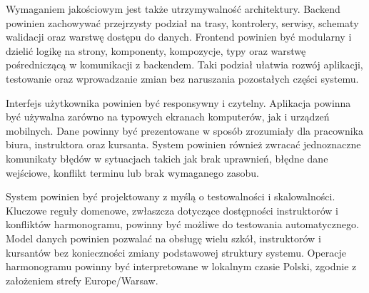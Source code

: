 Wymaganiem jakościowym jest także utrzymywalność architektury. Backend powinien zachowywać przejrzysty podział na trasy, kontrolery, serwisy, schematy walidacji oraz warstwę dostępu do danych. Frontend powinien być modularny i dzielić logikę na strony, komponenty, kompozycje, typy oraz warstwę pośredniczącą w komunikacji z backendem. Taki podział ułatwia rozwój aplikacji, testowanie oraz wprowadzanie zmian bez naruszania pozostałych części systemu.

Interfejs użytkownika powinien być responsywny i czytelny. Aplikacja powinna być używalna zarówno na typowych ekranach komputerów, jak i urządzeń mobilnych. Dane powinny być prezentowane w sposób zrozumiały dla pracownika biura, instruktora oraz kursanta. System powinien również zwracać jednoznaczne komunikaty błędów w sytuacjach takich jak brak uprawnień, błędne dane wejściowe, konflikt terminu lub brak wymaganego zasobu.

System powinien być projektowany z myślą o testowalności i skalowalności. Kluczowe reguły domenowe, zwłaszcza dotyczące dostępności instruktorów i konfliktów harmonogramu, powinny być możliwe do testowania automatycznego. Model danych powinien pozwalać na obsługę wielu szkół, instruktorów i kursantów bez konieczności zmiany podstawowej struktury systemu. Operacje harmonogramu powinny być interpretowane w lokalnym czasie Polski, zgodnie z założeniem strefy Europe/Warsaw.
